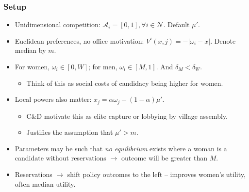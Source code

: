 \documentclass[11pt,aspectratio=169]{beamer}
\begin{document}
\begin{frame}
\frametitle{Setup}

\begin{itemize}
\item Unidimensional competition: $\mathcal{A}_i=[0,1], \forall i\in\mathcal{N}$. Default $\mu'$.
\item Euclidean preferences, no office motivation: $V^i(x,j) = -|\omega_i - x|$. Denote median by $m$.
\item For women, $\omega_i\in[0,W]$; for men, $\omega_i\in[M,1]$. And $\delta_M<\delta_W$. 
\begin{itemize}
\item Think of this as social costs of candidacy being higher for women.
\end{itemize}
\item Local powers also matter: $x_j = \alpha \omega_j + (1-\alpha) \mu'$.
\begin{itemize}
\item C\&D motivate this as elite capture or lobbying by village assembly.
\item Justifies the assumption that $\mu' > m$.
\end{itemize}
\end{itemize}

\bigskip

\begin{itemize}
\item Parameters may be such that \textit{no equilibrium} exists where a woman is a candidate without reservations $\rightarrow$ outcome will be greater than $M$.
\item Reservations $\rightarrow$ shift policy outcomes to the left -- improves women's utility, often median utility.
\end{itemize}

\end{frame}
\end{document}
